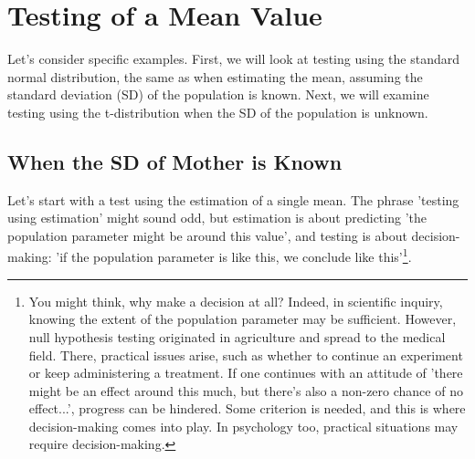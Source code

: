 \documentclass{ltjsbook}
\begin{document}
\section{Testing of a Mean Value}
Let's consider specific examples. First, we will look at testing using the standard normal distribution, the same as when estimating the mean, assuming the standard deviation (SD) of the population is known. Next, we will examine testing using the t-distribution when the SD of the population is unknown.
\subsection{When the SD of Mother is Known}
Let's start with a test using the estimation of a single mean. The phrase 'testing using estimation' might sound odd, but estimation is about predicting 'the population parameter might be around this value', and testing is about decision-making: 'if the population parameter is like this, we conclude like this'\footnote{You might think, why make a decision at all? Indeed, in scientific inquiry, knowing the extent of the population parameter may be sufficient. However, null hypothesis testing originated in agriculture and spread to the medical field. There, practical issues arise, such as whether to continue an experiment or keep administering a treatment. If one continues with an attitude of 'there might be an effect around this much, but there's also a non-zero chance of no effect...', progress can be hindered. Some criterion is needed, and this is where decision-making comes into play. In psychology too, practical situations may require decision-making.}.
\end{document}
